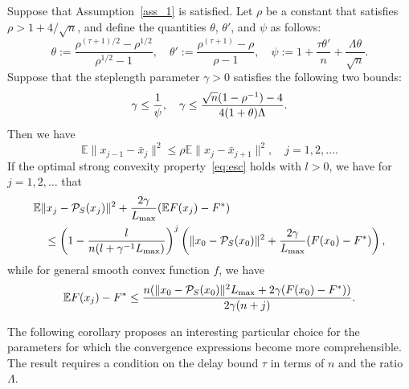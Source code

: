 \documentclass{siamltex}
\newcounter{ass_counter}
\begin{document}
\begin{theorem} \label{thm_2}
Suppose that Assumption~\ref{ass_1} is satisfied. Let $\rho$ be a
constant that satisfies $\rho>1+4/\sqrt{n}$, and define the quantities
$\theta$, $\theta'$, and $\psi$ as follows:
\begin{equation} \label{eq:defpsic}
\theta:=\frac{\rho^{(\tau+1)/2}-\rho^{1/2}}{\rho^{1/2}-1}, \quad \theta':=\frac{\rho^{(\tau+1)}-\rho}{\rho-1}, \quad \psi:= 1 + \frac{\tau\theta'}{n} + \frac{\Lambda\theta}{\sqrt{n}}.  
\end{equation} 
Suppose that the steplength parameter $\gamma>0$ satisfies the following two bounds:
  \begin{equation} \label{eq:boundgammac}
\gamma\le {1\over \psi}, \quad\gamma \le \frac{\sqrt{n}(1-\rho^{-1})-4}{4(1+\theta)\Lambda}.
\end{equation}
Then we have
\begin{equation}
{\mathbb{E}}\|x_{j-1}-\bar{x}_j\|^2 \leq \rho {\mathbb{E}} \|x_j-\bar{x}_{j+1}\|^2,
\quad j=1,2,\dotsc. \label{eqn_thm2_1}
\end{equation}
If the optimal strong convexity property~\eqref{eq:esc}
holds with $l>0$, we have for $j=1,2,\dotsc$ that
\begin{align}
\nonumber
&{\mathbb{E}} \|x_{j} - {\mathcal{P}_{S}}(x_{j})\|^2 + \frac{2\gamma}{L_{\mbox{\rm\scriptsize max}}}({\mathbb{E}} F(x_{j}) - F^*) 
\\ &\quad 
\leq \left(1- \frac{l} {n(l+\gamma^{-1}{L_{\mbox{\rm\scriptsize max}}})} \right)^{j} \left(\|x_0-{\mathcal{P}_{S}}(x_0)\|^2 + \frac{2\gamma}{L_{\mbox{\rm\scriptsize max}}}(F(x_0) - F^*)\right), 
\label{eqn_thm2_3}
\end{align}
while for general smooth convex function $f$, we have
\begin{equation}  \label{eqn_thm2_2}
{\mathbb{E}} F(x_{j})- F^* \leq \frac{n(\|x_0-{\mathcal{P}_{S}}(x_0)\|^2{L_{\mbox{\rm\scriptsize max}}}+ 2\gamma(F(x_0)- F^*))}{2\gamma (n+j)}.
\end{equation}
\end{theorem}

The following corollary proposes an interesting particular choice for
the parameters for which the convergence expressions become more
comprehensible. The result requires a condition on the delay bound
$\tau$ in terms of $n$ and the ratio $\Lambda$.
\end{document}
